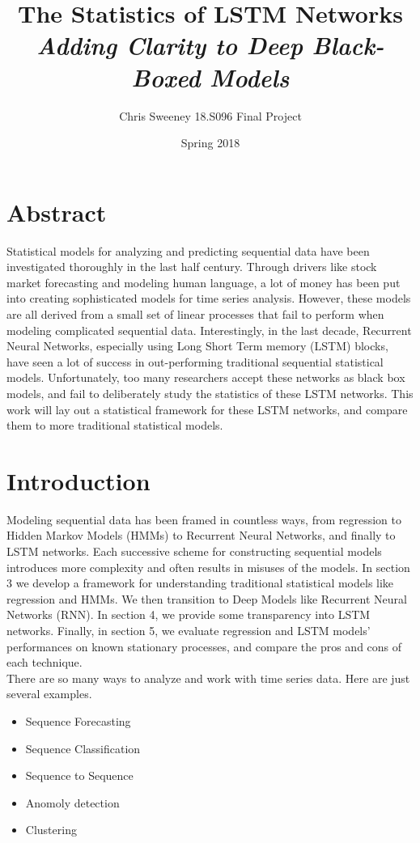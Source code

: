 \documentclass{article}
\title{The Statistics of LSTM Networks\\ \textit{Adding Clarity to Deep Black-Boxed Models}}
\author{Chris Sweeney 18.S096 Final Project}
\date{Spring 2018}
\begin{document}

\maketitle

\section{Abstract}
Statistical models for analyzing and predicting sequential data have been investigated thoroughly in the last half century. Through drivers like stock market forecasting and modeling human language, a lot of money has been put into creating sophisticated models for time series analysis. However, these models are all derived from a small set of linear processes that fail to perform when modeling complicated sequential data. Interestingly, in the last decade, Recurrent Neural Networks, especially using Long Short Term memory (LSTM) blocks, have seen a lot of success in out-performing traditional sequential statistical models. Unfortunately, too many researchers accept these networks as black box models, and fail to deliberately study the statistics of these LSTM networks. This work will lay out a statistical framework for these LSTM networks, and compare them to more traditional statistical models.

\section{Introduction}
Modeling sequential data has been framed in countless ways, from regression to Hidden Markov Models (HMMs) to Recurrent Neural Networks, and finally to LSTM networks. Each successive scheme for constructing sequential models introduces more complexity and often results in misuses of the models. In section 3 we develop a framework for understanding traditional statistical models like regression and HMMs. We then transition to Deep Models like Recurrent Neural Networks (RNN). In section 4, we provide some transparency into LSTM networks. Finally, in section 5, we evaluate regression and LSTM models' performances on known stationary processes, and compare the pros and cons of each technique. \\

\noindent There are so many ways to analyze and work with time series data. Here are just several examples.\\
\begin{itemize}
  \item Sequence Forecasting
  \item Sequence Classification
  \item Sequence to Sequence 
  \item Anomoly detection
  \item Clustering
\end{itemize}
\end{document}
